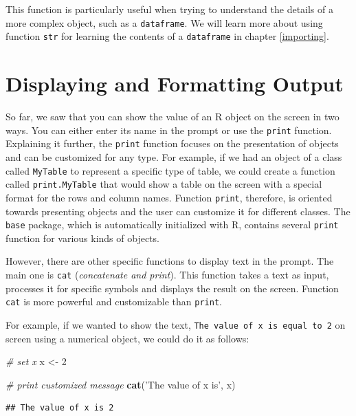 \documentclass[11pt,]{book}
\newenvironment{Shaded}{\begin{snugshade}}{\end{snugshade}}
\newcommand{\KeywordTok}[1]{\textcolor[rgb]{0.27,0.27,0.27}{\textbf{#1}}}
\newcommand{\DecValTok}[1]{\textcolor[rgb]{0.06,0.06,0.06}{#1}}
\newcommand{\StringTok}[1]{\textcolor[rgb]{0.5,0.5,0.5}{#1}}
\newcommand{\CommentTok}[1]{\textcolor[rgb]{0.56,0.35,0.01}{\textit{#1}}}
\newcommand{\NormalTok}[1]{#1}
\begin{document}
This function is particularly useful when trying to understand the
details of a more complex object, such as a \texttt{dataframe}. We will
learn more about using function \texttt{str} for learning the contents
of a \texttt{dataframe} in chapter \ref{importing}.

\section{Displaying and Formatting
Output}\label{displaying-and-formatting-output}

So far, we saw that you can show the value of an R object on the screen
in two ways. You can either enter its name in the prompt or use the
\texttt{print} function. Explaining it further, the \texttt{print}
function focuses on the presentation of objects and can be customized
for any type. For example, if we had an object of a class called
\texttt{MyTable} to represent a specific type of table, we could create
a function called \texttt{print.MyTable} that would show a table on the
screen with a special format for the rows and column names. Function
\texttt{print}, therefore, is oriented towards presenting objects and
the user can customize it for different classes. The \texttt{base}
package, which is automatically initialized with R, contains several
\texttt{print} function for various kinds of objects.

However, there are other specific functions to display text in the
prompt. The main one is \texttt{cat} (\emph{concatenate and print}).
This function takes a text as input, processes it for specific symbols
and displays the result on the screen. Function \texttt{cat} is more
powerful and customizable than \texttt{print}. 

For example, if we wanted to show the text,
\texttt{The\ value\ of\ x\ is\ equal\ to\ 2} on screen using a numerical
object, we could do it as follows:

\begin{Shaded}
\begin{Highlighting}[]
\CommentTok{# set x}
\NormalTok{x <-}\StringTok{ }\DecValTok{2}

\CommentTok{# print customized message}
\KeywordTok{cat}\NormalTok{(}\StringTok{'The value of x is'}\NormalTok{, x)}
\end{Highlighting}
\end{Shaded}

\begin{verbatim}
## The value of x is 2
\end{verbatim}
\end{document}
